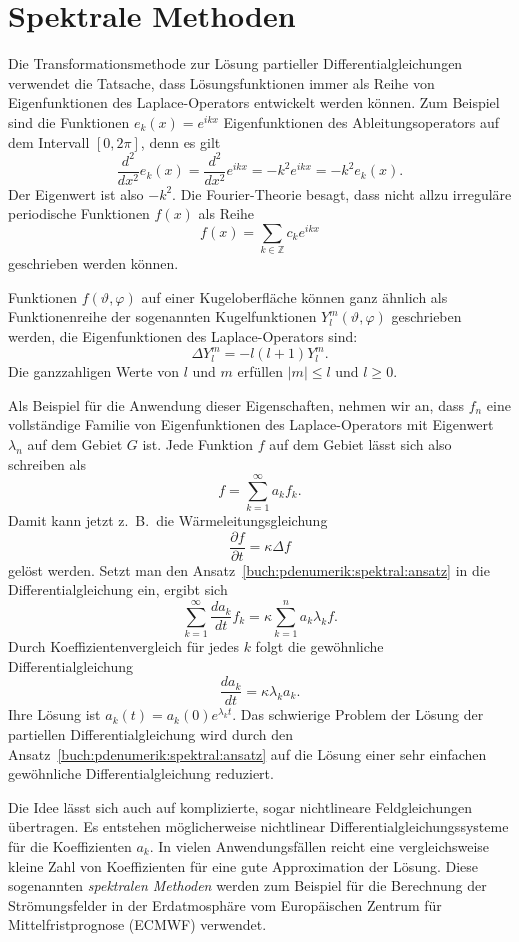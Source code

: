 %
%
\section{Spektrale Methoden
\label{buch:pdenumerik:section:spektral}}
%
Die Transformationsmethode zur Lösung partieller Differentialgleichungen
verwendet die Tatsache, dass Lösungsfunktionen immer als Reihe von
Eigenfunktionen des Laplace-Operators entwickelt werden können.
Zum Beispiel sind die Funktionen
\(
e_k(x) = e^{ikx}
\)
Eigenfunktionen des Ableitungsoperators auf dem Intervall $[0,2\pi]$,
denn es gilt
\[
\frac{d^2}{dx^2} e_k(x)
=
\frac{d^2}{dx^2} e^{ikx}
=
-k^2 e^{ikx}
=
-k^2 e_k(x).
\]
Der Eigenwert ist also $-k^2$.
Die Fourier-Theorie besagt, dass nicht allzu irreguläre periodische
Funktionen $f(x)$ als Reihe
\[
f(x)
=
\sum_{k\in\mathbb{Z}} c_ke^{ikx}
\]
geschrieben werden können.

Funktionen $f(\vartheta,\varphi)$ auf einer Kugeloberfläche können
ganz ähnlich als Funktionenreihe der sogenannten Kugelfunktionen
$Y^m_l(\vartheta,\varphi)$ geschrieben werden, die Eigenfunktionen
des Laplace-Operators sind:
\[
\Delta Y^m_l
=
-l(l+1) Y^m_l.
\]
Die ganzzahligen Werte von $l$ und $m$ erfüllen $|m|\le l$ und $l\ge 0$.

Als Beispiel für die Anwendung dieser Eigenschaften, nehmen wir an,
dass $f_n$ eine vollständige Familie von Eigenfunktionen des Laplace-Operators
mit Eigenwert $\lambda_n$ auf dem Gebiet $G$ ist. 
Jede Funktion $f$ auf dem Gebiet lässt sich also schreiben als
\begin{equation}
f = \sum_{k=1}^\infty a_k f_k.
\label{buch:pdenumerik:spektral:ansatz}
\end{equation}
Damit kann jetzt z.~B.~die Wärmeleitungsgleichung
\[
\frac{\partial f}{\partial t}
=
\kappa
\Delta f
\]
gelöst werden.
Setzt man den Ansatz~\eqref{buch:pdenumerik:spektral:ansatz} in die 
Differentialgleichung ein, ergibt sich
\[
\sum_{k=1}^\infty
\frac{d a_k}{d t}
f_k
=
\kappa \sum_{k=1}^n a_k \lambda_k f.
\]
Durch Koeffizientenvergleich für jedes $k$ folgt die gewöhnliche
Differentialgleichung
\[
\frac{d a_k}{d t}
=
\kappa \lambda_k a_k.
\]
Ihre Lösung ist $a_k(t) = a_k(0) e^{\lambda_kt}$.
Das schwierige Problem der Lösung der partiellen Differentialgleichung
wird durch den Ansatz~\eqref{buch:pdenumerik:spektral:ansatz} auf die
Lösung einer sehr einfachen gewöhnliche Differentialgleichung reduziert.

Die Idee lässt sich auch auf komplizierte, sogar nichtlineare
Feldgleichungen übertragen.
Es entstehen möglicherweise nichtlinear Differentialgleichungssysteme
für die Koeffizienten $a_k$.
In vielen Anwendungsfällen reicht eine vergleichsweise kleine Zahl
von Koeffizienten für eine gute Approximation der Lösung.
Diese sogenannten \emph{spektralen Methoden}
%
werden zum Beispiel für die Berechnung der Strömungsfelder in der 
Erdatmosphäre vom Europäischen Zentrum für Mittelfristprognose
(ECMWF) verwendet.

